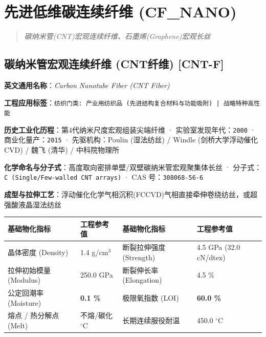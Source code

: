 \documentclass[11pt,openright,twoside,UTF8]{ctexbook}
\begin{document}
\chapter{先进低维碳连续纤维 (CF\_NANO)}
\begin{quote}
\small\itshape
碳纳米管(CNT)宏观连续纤维、石墨烯(Graphene)宏观长丝
\end{quote}

\section{碳纳米管宏观连续纤维 (CNT纤维) [CNT-F]}
\label{sec:cnt-f}

\noindent\textbf{英文通用名称}：\textit{Carbon Nanotube Fiber (CNT Fiber)}\par
\noindent\textbf{工程应用标签}：\texttt{纺织门类: 产业用纺织品 (先进结构复合材料与功能吸附) | 战略特种高性能}\par
\noindent\textbf{历史工业化历程}：第4代纳米尺度宏观组装尖端纤维 · 实验室发现年代：\texttt{2000} · 商业化量产：\texttt{2015} · 先驱机构：Poulin (湿法纺丝) / Windle (剑桥大学浮动催化CVD) / 魏飞 (清华) / 中科院物理所\par
\noindent\textbf{化学命名与分子式}：高度取向密排单壁/双壁碳纳米管宏观聚集体长丝 · 分子式：\texttt{C (Single/Few-walled CNT arrays)} · CAS 号：\texttt{308068-56-6}\par
\noindent\textbf{成型与拉伸工艺}：浮动催化化学气相沉积(FCCVD)气相直接牵伸卷绕纺丝，或超强酸液晶湿法纺丝\par

\vspace{0.15cm}
\begin{center}
\small
\begin{tabularx}{\textwidth}{p{3.8cm}Xp{3.8cm}X}
\toprule
\textbf{基础物化指标} & \textbf{工程参考值} & \textbf{基础物化指标} & \textbf{工程参考值} \\
\midrule
晶体密度 (Density) & 1.4 g/cm$^3$ & 断裂拉伸强度 (Strength) & 4.5 GPa (32.0 cN/dtex) \\
拉伸初始模量 (Modulus) & 250.0 GPa & 断裂伸长率 (Elongation) & 4.5 \% \\
公定回潮率 (Moisture) & \textbf{0.1 \%} & 极限氧指数 (LOI) & \textbf{60.0 \%} \\
熔点 / 热分解点 (Melt) & 不熔/碳化 $^\circ\mathrm{C}$ & 长期连续服役耐温 & 450.0 $^\circ\mathrm{C}$ \\
\bottomrule
\end{tabularx}
\end{center}
\vspace{0.15cm}
\end{document}
